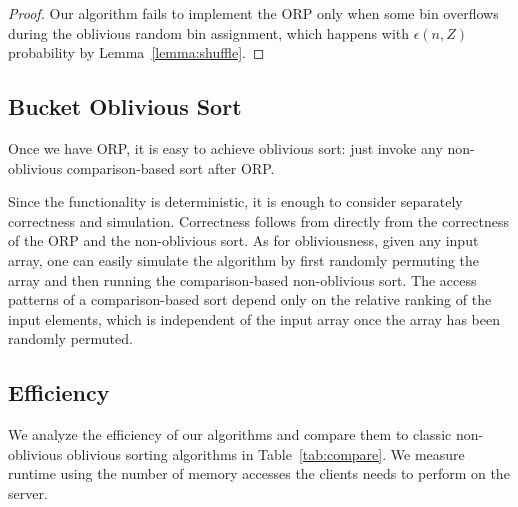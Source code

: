 \begin{proof}
Our algorithm fails to implement the ORP only when some bin overflows during the oblivious random bin assignment, which happens with $\epsilon(n,Z)$ probability by Lemma~\ref{lemma:shuffle}.
\end{proof}

\subsection{Bucket Oblivious Sort}
\label{sec:osort}
Once we have ORP, it is easy to achieve oblivious sort: just invoke any non-oblivious comparison-based sort after ORP.

Since the functionality is deterministic, it is enough to consider separately correctness and simulation. Correctness follows from directly from the correctness of the ORP and the non-oblivious sort. As for obliviousness, given any input array, one can easily simulate the algorithm by first randomly permuting the array and then running the comparison-based non-oblivious sort. 
The access patterns of a comparison-based sort depend only on the relative ranking of the input elements, which is independent of the input array once the array has been randomly permuted. 

\subsection{Efficiency}
\label{sec:efficiency}

We analyze the efficiency of our algorithms and compare them to classic non-oblivious oblivious sorting algorithms in Table~\ref{tab:compare}.
We measure runtime using the number of memory accesses the clients needs to perform on the server.





